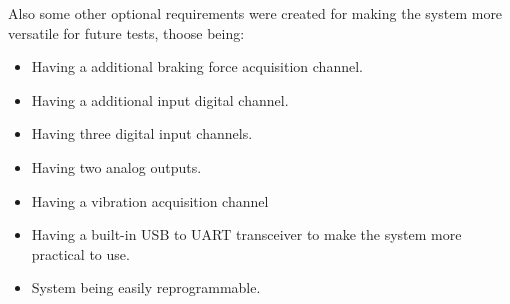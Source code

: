 	Also some other optional requirements were created for making the system more versatile for future tests, thoose being:

	\begin{itemize}
		\item Having a additional braking force acquisition channel.
		\item Having a additional input digital channel.
		\item Having three digital input channels.
		\item Having two analog outputs.
		\item Having a vibration acquisition channel
		\item Having a built-in USB to UART transceiver to make the system more practical to use.
		\item System being easily reprogrammable.
	\end{itemize}

\begin{comment}
\section{Software Requirements}\label{sec:software-requirements}
	
	\begin{enumerate}
		\item System must have a sampling rate of 50 ms.\label{itm:soft-req-1}
		\item System must be able to monitor six analog channels at once.\label{itm:soft-req-2}
		\item System must be able to control the digital outputs and one analog output during acquisition without loosing the real time constrain.\label{itm:soft-req-3}
		\item The data acquired does not need to be shown to user in real time.\label{itm:soft-req-4}
		\item The software layer must be able to record the data of the test.\label{itm:soft-req-5}
		\item The software highest layer must have a friendly GUI, advanced electronic and simple programmable knowledge cannot be a requirement to operate the software.\label{itm:soft-req-6}
		\item Calibration of the sensors data must be easy to modify on the software.\label{itm:soft-req-7}
		\item Software must be multiplatform.\label{itm:soft-req-8}
	\end{enumerate}
\end{comment}